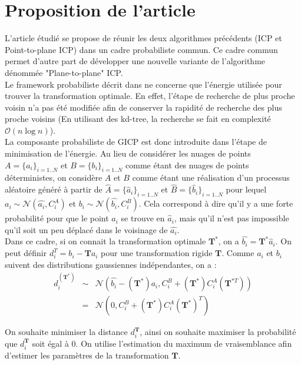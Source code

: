 \section{Proposition de l'article}

L'article étudié se propose de réunir les deux algorithmes précédents (ICP et Point-to-plane ICP) dans un cadre probabiliste commun. Ce cadre commun permet d'autre part de développer une nouvelle variante de l'algorithme dénommée "Plane-to-plane" ICP.\\

Le framework probabiliste décrit dans \cite{bib_gicp} ne concerne que l'énergie utilisée pour trouver la transformation optimale. En effet, l'étape de recherche de plus proche voisin n'a pas été modifiée afin de conserver la rapidité de recherche des plus proche voisins (En utilisant des kd-tree, la recherche se fait en complexité $\mathcal{O}(n\log{}n)$).\\

La composante probabiliste de GICP est donc introduite dans l'étape de minimisation de l'énergie. Au lieu de considérer les nuages de points $A = \{a_{i}\}_{i=1..N}$ et $B = \{b_{i}\}_{i=1..N}$ comme étant des nuages de points déterministes, on considère $A$ et $B$ comme étant une réalisation d'un processus aléatoire généré à partir de  $\hat{A} = \{\hat{a}_{i}\}_{i=1..N}$ et $\hat{B} = \{\hat{b}_{i}\}_{i=1..N}$ pour lequel $a_{i} \sim \mathcal{N}(\hat{a_{i}}, C_{i}^A)$ et $b_{i} \sim \mathcal{N}(\hat{b_{i}}, C_{i}^B)$. Cela correspond à dire qu'il y a une forte probabilité pour que le point $a_{i}$ se trouve en $\hat{a}_i$, mais qu'il n'est pas impossible qu'il soit un peu déplacé dans le voisinage de $\hat{a_{i}}$.\\

Dans ce cadre, si on connait la transformation optimale $\mathbf{T}^{*}$, on a $\hat{b_{i}} = \mathbf{T}^{*}\hat{a}_{i}$. On peut définir $d_{i}^{T} = b_{i} - \mathbf{T}a_{i}$ pour une transformation rigide $\mathbf{T}$. Comme $a_{i}$ et $b_{i}$ suivent des distributions gaussiennes indépendantes, on a :
\begin{eqnarray}
d_{i}^{(\mathbf{T}^{*})} &\sim& \mathcal{N}(\hat{b_{i}}-(\mathbf{T}^{*})a_{i},C_{i}^B + (\mathbf{T}^{*})C_{i}^{A}(\mathbf{T}^{*T}))\\
&=& \mathcal{N}(0,C_{i}^B + (\mathbf{T}^{*})C_{i}^{A}(\mathbf{T}^{*})^{T})
\end{eqnarray}

On souhaite minimiser la distance $d_{i}^{\mathbf{T}}$, ainsi on souhaite maximiser la probabilité que $d_{i}^{\mathbf{T}}$ soit égal à 0. On utilise l'estimation du maximum de vraisemblance afin d'estimer les paramètres de la transformation $\mathbf{T}$.

